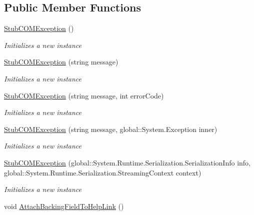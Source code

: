 \subsection*{Public Member Functions}
\begin{DoxyCompactItemize}
\item 
\hyperlink{class_system_1_1_runtime_1_1_interop_services_1_1_fakes_1_1_stub_c_o_m_exception_aa3c4d0771e89e5a7215c5ae4b528eda1}{Stub\-C\-O\-M\-Exception} ()
\begin{DoxyCompactList}\small\item\em Initializes a new instance\end{DoxyCompactList}\item 
\hyperlink{class_system_1_1_runtime_1_1_interop_services_1_1_fakes_1_1_stub_c_o_m_exception_ad93b3d149db2bf8666cb3c0e3286b335}{Stub\-C\-O\-M\-Exception} (string message)
\begin{DoxyCompactList}\small\item\em Initializes a new instance\end{DoxyCompactList}\item 
\hyperlink{class_system_1_1_runtime_1_1_interop_services_1_1_fakes_1_1_stub_c_o_m_exception_a100d911f0f385bf5fb36fd77c4acfa8c}{Stub\-C\-O\-M\-Exception} (string message, int error\-Code)
\begin{DoxyCompactList}\small\item\em Initializes a new instance\end{DoxyCompactList}\item 
\hyperlink{class_system_1_1_runtime_1_1_interop_services_1_1_fakes_1_1_stub_c_o_m_exception_a3a4b1e3c742dc4e76483689bf0c1835e}{Stub\-C\-O\-M\-Exception} (string message, global\-::\-System.\-Exception inner)
\begin{DoxyCompactList}\small\item\em Initializes a new instance\end{DoxyCompactList}\item 
\hyperlink{class_system_1_1_runtime_1_1_interop_services_1_1_fakes_1_1_stub_c_o_m_exception_a93088594524ff10d0e9b4cc228fcd8b3}{Stub\-C\-O\-M\-Exception} (global\-::\-System.\-Runtime.\-Serialization.\-Serialization\-Info info, global\-::\-System.\-Runtime.\-Serialization.\-Streaming\-Context context)
\begin{DoxyCompactList}\small\item\em Initializes a new instance\end{DoxyCompactList}\item 
void \hyperlink{class_system_1_1_runtime_1_1_interop_services_1_1_fakes_1_1_stub_c_o_m_exception_a7621540ae19ac1881dfa72cd1d408a5a}{Attach\-Backing\-Field\-To\-Help\-Link} ()

\end{DoxyCompactItemize}

